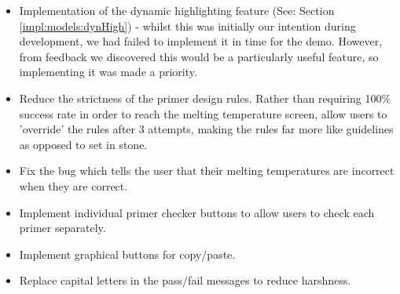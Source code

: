\begin{itemize}

\item Implementation of the dynamic highlighting feature (See: Section \ref{impl:models:dynHigh}) - whilst this was initially our intention during development, we had failed to implement it in time for the demo. However, from feedback we discovered this would be a particularly useful feature, so implementing it was made a priority.
\item Reduce the strictness of the primer design rules. Rather than requiring 100\% success rate in order to reach the melting temperature screen, allow users to 'override' the rules after 3 attempts, making the rules far more like guidelines as opposed to set in stone.
\item Fix the bug which tells the user that their melting temperatures are incorrect when they are correct.
\item Implement individual primer checker buttons to allow users to check each primer separately.
\item Implement graphical buttons for copy/paste.
\item Replace capital letters in the pass/fail messages to reduce harshness.

\end{itemize}

